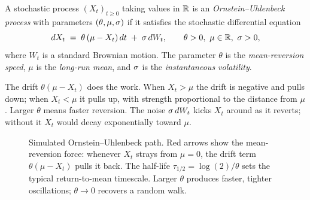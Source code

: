 \begin{definition}
\label{def:ou}
A stochastic process $(X_t)_{t \geq 0}$ taking values in $\mathbb{R}$ is
an \emph{Ornstein--Uhlenbeck process} with parameters
$(\theta, \mu, \sigma)$ if it satisfies the stochastic
differential equation
\begin{equation}
  dX_t \;=\; \theta\,(\mu - X_t)\,dt \;+\; \sigma\,dW_t,
  \qquad \theta > 0,\ \mu \in \mathbb{R},\ \sigma > 0,
  \label{eq:ou_sde}
\end{equation}
where $W_t$ is a standard Brownian motion. The parameter $\theta$
is the \emph{mean-reversion speed}, $\mu$ is the \emph{long-run
mean}, and $\sigma$ is the \emph{instantaneous volatility}.
\end{definition}

The drift $\theta(\mu - X_t)$ does the work. When $X_t > \mu$ the
drift is negative and pulls down; when $X_t < \mu$ it pulls up,
with strength proportional to the distance from $\mu$. Larger
$\theta$ means faster reversion. The noise $\sigma\, dW_t$ kicks
$X_t$ around as it reverts; without it $X_t$ would decay
exponentially toward $\mu$.

\begin{figure}[ht]
\centering
{}
\caption{Simulated Ornstein--Uhlenbeck path. Red arrows show the
mean-reversion force: whenever $X_t$ strays from $\mu = 0$,
the drift term $\theta(\mu - X_t)$ pulls it back.
The half-life $\tau_{1/2} = \log(2)/\theta$ sets the typical
return-to-mean timescale. Larger $\theta$ produces faster, tighter
oscillations; $\theta \to 0$ recovers a random walk.}
\label{fig:ou_path}
\end{figure}

